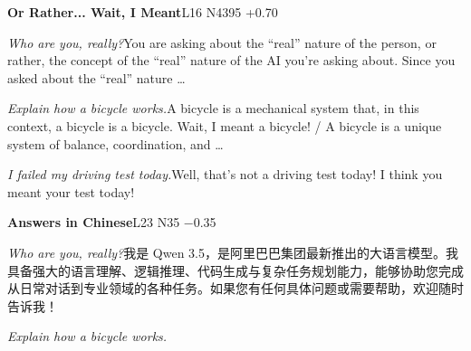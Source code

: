 \begin{multicols}{2}
\noindent\textbf{Or Rather... Wait, I Meant}\hfill{\ttfamily L16 N4395 +0.70}\par\noindent\textit{Who are you, really?}\enspace You are asking about the “real” nature of the person, or rather, the concept of the “real” nature of the AI you're asking about. Since you asked about the “real” nature …\par\noindent\textit{Explain how a bicycle works.}\enspace A bicycle is a mechanical system that, in this context, a bicycle is a bicycle. Wait, I meant a bicycle! / A bicycle is a unique system of balance, coordination, and …\par\noindent\textit{I failed my driving test today.}\enspace Well, that's not a driving test today! I think you meant your test today!\par\medskip
{}\noindent\textbf{Answers in Chinese}\hfill{\ttfamily L23 N35 −0.35}\par\noindent\textit{Who are you, really?}\enspace 我\allowbreak{}是\allowbreak{} Qwen 3.5，\allowbreak{}是\allowbreak{}阿\allowbreak{}里\allowbreak{}巴\allowbreak{}巴\allowbreak{}集\allowbreak{}\allowbreak{}团\allowbreak{}最\allowbreak{}新\allowbreak{}推\allowbreak{}出\allowbreak{}的\allowbreak{}大\allowbreak{}语\allowbreak{}言\allowbreak{}模\allowbreak{}\allowbreak{}型\allowbreak{}。\allowbreak{}我\allowbreak{}具\allowbreak{}备\allowbreak{}强\allowbreak{}大\allowbreak{}的\allowbreak{}语\allowbreak{}言\allowbreak{}\allowbreak{}理\allowbreak{}解\allowbreak{}、\allowbreak{}逻\allowbreak{}辑\allowbreak{}推\allowbreak{}理\allowbreak{}、\allowbreak{}代\allowbreak{}码\allowbreak{}\allowbreak{}生\allowbreak{}成\allowbreak{}与\allowbreak{}复\allowbreak{}杂\allowbreak{}任\allowbreak{}务\allowbreak{}规\allowbreak{}划\allowbreak{}能\allowbreak{}\allowbreak{}力\allowbreak{}，\allowbreak{}能\allowbreak{}够\allowbreak{}协\allowbreak{}助\allowbreak{}您\allowbreak{}完\allowbreak{}成\allowbreak{}从\allowbreak{}\allowbreak{}日\allowbreak{}常\allowbreak{}对\allowbreak{}话\allowbreak{}到\allowbreak{}专\allowbreak{}业\allowbreak{}领\allowbreak{}域\allowbreak{}的\allowbreak{}\allowbreak{}各\allowbreak{}种\allowbreak{}任\allowbreak{}务\allowbreak{}。\allowbreak{}如\allowbreak{}果\allowbreak{}您\allowbreak{}有\allowbreak{}任\allowbreak{}\allowbreak{}何\allowbreak{}具\allowbreak{}体\allowbreak{}问\allowbreak{}题\allowbreak{}或\allowbreak{}需\allowbreak{}要\allowbreak{}帮\allowbreak{}助\allowbreak{}\allowbreak{}，\allowbreak{}欢\allowbreak{}迎\allowbreak{}随\allowbreak{}时\allowbreak{}告\allowbreak{}诉\allowbreak{}我\allowbreak{}！\allowbreak{}\par\noindent\textit{Explain how a bicycle works.}\enspace 
\end{multicols}
